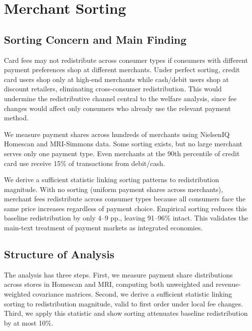 \documentclass[main.tex]{subfiles}
\begin{document}
\section{Merchant Sorting}
\label{sec:oa-merchant-sorting}

\subsection{Sorting Concern and Main Finding}

Card fees may not redistribute across consumer types if consumers with different payment preferences shop at different merchants.
Under perfect sorting, credit card users shop only at high-end merchants while cash/debit users shop at discount retailers, eliminating cross-consumer redistribution.
This would undermine the redistributive channel central to the welfare analysis, since fee changes would affect only consumers who already use the relevant payment method.

We measure payment shares across hundreds of merchants using NielsenIQ Homescan and MRI-Simmons data.
Some sorting exists, but no large merchant serves only one payment type.
Even merchants at the 90th percentile of credit card use receive 15\% of transactions from debit/cash.

We derive a sufficient statistic linking sorting patterns to redistribution magnitude.
With no sorting (uniform payment shares across merchants), merchant fees redistribute across consumer types because all consumers face the same price increases regardless of payment choice.
Empirical sorting reduces this baseline redistribution by only 4--9 pp., leaving 91--96\% intact.
This validates the main-text treatment of payment markets as integrated economies.

\subsection{Structure of Analysis}

The analysis has three steps.
First, we measure payment share distributions across stores in Homescan and MRI, computing both unweighted and revenue-weighted covariance matrices.
Second, we derive a sufficient statistic linking sorting to redistribution magnitude, valid to first order under local fee changes.
Third, we apply this statistic and show sorting attenuates baseline redistribution by at most 10\%.
\end{document}
